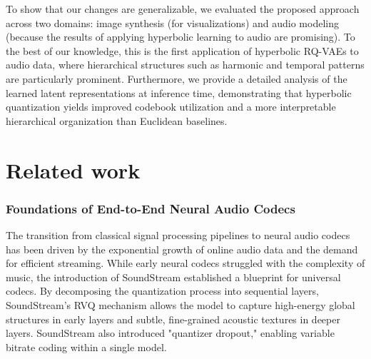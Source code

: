 \documentclass[12pt]{report}
\begin{document}
To show that our changes are generalizable, we evaluated the proposed approach across two domains: image synthesis (for visualizations) and audio modeling (because the results of applying hyperbolic learning to audio are promising). To the best of our knowledge, this is the first application of hyperbolic RQ-VAEs to audio data, where hierarchical structures such as harmonic and temporal patterns are particularly prominent. Furthermore, we provide a detailed analysis of the learned latent representations at inference time, demonstrating that hyperbolic quantization yields improved codebook utilization and a more interpretable hierarchical organization than Euclidean baselines.

\chapter{Related work}
\subsection{Foundations of End-to-End Neural Audio Codecs}

The transition from classical signal processing pipelines to neural audio codecs has been driven by the exponential growth of online audio data and the demand for efficient streaming. While early neural codecs struggled with the complexity of music, the introduction of SoundStream \cite{soundstream} established a blueprint for universal codecs. By decomposing the quantization process into sequential layers, SoundStream's RVQ mechanism allows the model to capture high-energy global structures in early layers and subtle, fine-grained acoustic textures in deeper layers. SoundStream also introduced "quantizer dropout," enabling variable bitrate coding within a single model.
\end{document}
